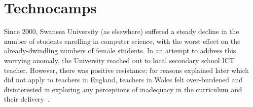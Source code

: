\documentclass[conference]{IEEEtran}
\begin{document}







\section{Technocamps}\label{technocamps}
Since 2000, Swansea University (as elsewhere) suffered a steady decline
in the number of students enrolling in computer science,
with the worst effect on the already-dwindling numbers of female students.
In an attempt to address this worrying anomaly, the University
reached out to local secondary school ICT teacher.
However, there was positive resistance;
for reasons explained later which did not apply to
teachers in England, teachers in Wales felt
over-burdened and disinterested in exploring any perceptions of
inadequacy in the curriculum and their
delivery~\cite{crick+sentance:2011,brown-et-al-sigcse2012}.
\end{document}
